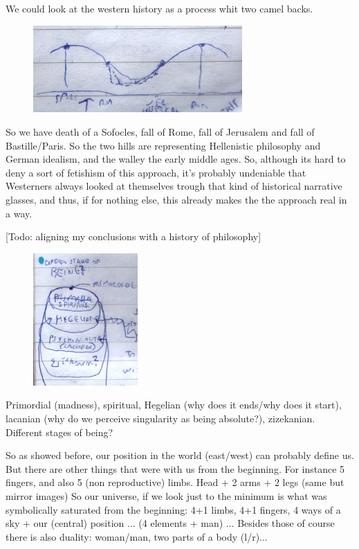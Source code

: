 \documentclass[10pt]{book}
\begin{document}
We could look at the western history as a process whit two camel backs. 
\begin{figure}[ht!]
\centering
\includegraphics[width=80mm]{scan11.jpg}
\label{overflow}
\end{figure}
So we have death of a Sofocles, fall of Rome, fall of Jerusalem and fall of Bastille/Paris. So the two hills are representing Hellenistic philosophy and German idealism, and the walley the early middle ages.
So, although its hard to deny a sort of fetishism of this approach, it's probably undeniable that Westerners always looked at themselves trough that kind of historical narrative glasses, and  thus, if for nothing else, this already makes the the approach real in a way.

[Todo: aligning my conclusions with a history of philosophy]

\begin{figure}[ht!]
\centering
\includegraphics[width=40mm]{scan13.jpg}
\label{overflow}
\end{figure}
Primordial (madness), spiritual, Hegelian (why does it ends/why does it start), lacanian (why do we perceive singularity as being absolute?), zizekanian. 
Different stages of being?

So as showed before, our position in the world (east/west) can probably define us. But there are other things that were with us from the beginning. For instance 5 fingers, and also 5 (non reproductive) limbs. Head + 2 arms + 2 legs (same but mirror images)
So our universe, if we look just to the minimum is what was symbolically saturated from the beginning: 4+1 limbs, 4+1 fingers, 4 ways of a sky + our (central) position ... (4 elements + man) ... Besides those of course there is also duality: woman/man, two parts of a body (l/r)...
\end{document}
